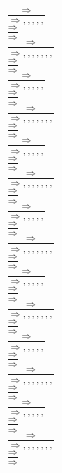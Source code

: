 \documentclass[11pt]{article}
\begin{document}
\begin{center}
\bigskip
\\$\frac{\Rightarrow }{\Rightarrow , , , , , }$
\bigskip
\\$\frac{\Rightarrow }{\Rightarrow }$
\bigskip
\\$\frac{\Rightarrow }{\Rightarrow , , , , , , , }$
\bigskip
\\$\frac{\Rightarrow }{\Rightarrow }$
\bigskip
\\$\frac{\Rightarrow }{\Rightarrow , , , , , }$
\bigskip
\\$\frac{\Rightarrow }{\Rightarrow }$
\bigskip
\\$\frac{\Rightarrow }{\Rightarrow , , , , , , , }$
\bigskip
\\$\frac{\Rightarrow }{\Rightarrow }$
\bigskip
\\$\frac{\Rightarrow }{\Rightarrow , , , , , }$
\bigskip
\\$\frac{\Rightarrow }{\Rightarrow }$
\bigskip
\\$\frac{\Rightarrow }{\Rightarrow , , , , , , , }$
\bigskip
\\$\frac{\Rightarrow }{\Rightarrow }$
\bigskip
\\$\frac{\Rightarrow }{\Rightarrow , , , , , }$
\bigskip
\\$\frac{\Rightarrow }{\Rightarrow }$
\bigskip
\\$\frac{\Rightarrow }{\Rightarrow , , , , , , , }$
\bigskip
\\$\frac{\Rightarrow }{\Rightarrow }$
\bigskip
\\$\frac{\Rightarrow }{\Rightarrow , , , , , }$
\bigskip
\\$\frac{\Rightarrow }{\Rightarrow }$
\bigskip
\\$\frac{\Rightarrow }{\Rightarrow , , , , , , , }$
\bigskip
\\$\frac{\Rightarrow }{\Rightarrow }$
\bigskip
\\$\frac{\Rightarrow }{\Rightarrow , , , , , }$
\bigskip
\\$\frac{\Rightarrow }{\Rightarrow }$
\bigskip
\\$\frac{\Rightarrow }{\Rightarrow , , , , , , , }$
\bigskip
\\$\frac{\Rightarrow }{\Rightarrow }$
\bigskip
\\$\frac{\Rightarrow }{\Rightarrow , , , , , }$
\bigskip
\\$\frac{\Rightarrow }{\Rightarrow }$
\bigskip
\\$\frac{\Rightarrow }{\Rightarrow , , , , , , , }$
\bigskip
\\$\frac{\Rightarrow }{\Rightarrow }$

\end{center}
\end{document}
